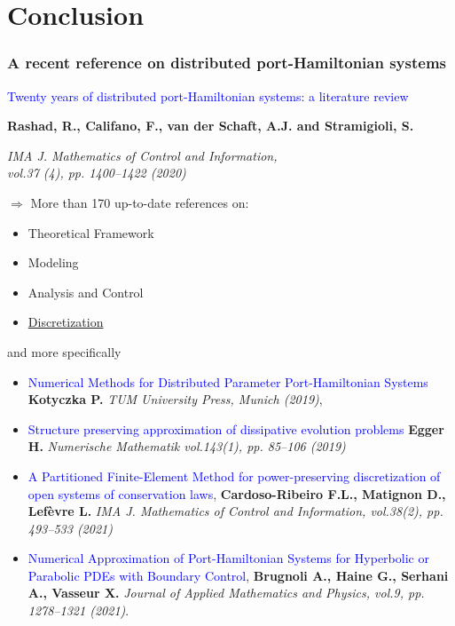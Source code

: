 \documentclass[10pt,aspectratio=43]{ISAE-Beamer}
\newcommand{\blue}[1]{\textcolor{blue}{#1}}
\begin{document}
\section{Conclusion}

\begin{frame}
	\frametitle{\small A recent reference on distributed port-Hamiltonian systems}
	\blue{Twenty years of distributed port-Hamiltonian systems: a literature review}
	
	\textbf{\quad Rashad, R.,  Califano, F.,  van der Schaft, A.J. and Stramigioli, S.}
	
	\quad \textit{IMA J. Mathematics of Control and Information, \\
		\quad vol.37 (4), pp. 1400--1422 (2020)}
	
	\vspace{5mm}
	
	$\Longrightarrow$ More than 170 up-to-date references on:
	\begin{itemize}
		\item Theoretical Framework
		\item Modeling
		\item Analysis and Control
		\item \underline{Discretization}
	\end{itemize}
\end{frame}

\begin{frame}{and more specifically}
	\begin{itemize}
		\item \blue{Numerical Methods for Distributed Parameter Port-Hamiltonian Systems}
		\textbf{\quad Kotyczka P.}
		\quad  \textit{TUM University Press, Munich (2019)},
		\item \blue{Structure preserving approximation of dissipative evolution problems}
		\textbf{\quad  Egger H.}
		\quad  \textit{Numerische Mathematik vol.143(1), pp. 85--106 (2019)}
		\item \blue{A Partitioned Finite-Element Method for power-preserving discretization of open systems of conservation laws},
		\textbf{\quad Cardoso-Ribeiro F.L., Matignon D., Lef\`evre L.}
		\quad  \textit{IMA J. Mathematics of Control and Information, vol.38(2), pp. 493--533 (2021)}
		\item \blue{Numerical Approximation of Port-Hamiltonian
			Systems for Hyperbolic or Parabolic PDEs with
			Boundary Control},
		\textbf{\quad Brugnoli A., Haine G., Serhani A., Vasseur X.}
		\quad  \textit{Journal of Applied Mathematics and Physics, vol.9,  pp. 1278--1321 (2021)}.
	\end{itemize}
	
\end{frame}
\end{document}
